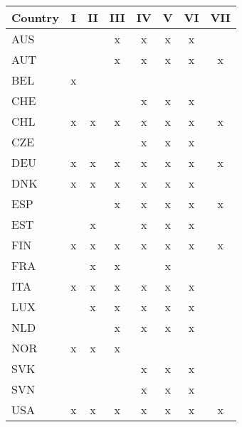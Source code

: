\begin{tabular}{lccccccc}
Country & I & II & III & IV & V & VI & VII \\  \hline 
AUS&&&x&x&x&x&\\
AUT&&&x&x&x&x&x\\
BEL&x&&&&&&\\
CHE&&&&x&x&x&\\
CHL&x&x&x&x&x&x&x\\
CZE&&&&x&x&x&\\
DEU&x&x&x&x&x&x&x\\
DNK&x&x&x&x&x&x&\\
ESP&&&x&x&x&x&x\\
EST&&x&&x&x&x&\\
FIN&x&x&x&x&x&x&x\\
FRA&&x&x&&x&&\\
ITA&x&x&x&x&x&x&\\
LUX&&x&x&x&x&x&\\
NLD&&&x&x&x&x&\\
NOR&x&x&x&&&&\\
SVK&&&&x&x&x&\\
SVN&&&&x&x&x&\\
USA&x&x&x&x&x&x&x\\
\hline \end{tabular}
